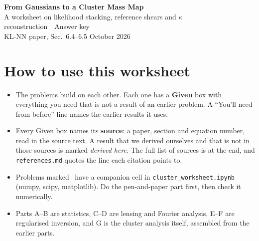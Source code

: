 \begin{center}
{\LARGE\bfseries From Gaussians to a Cluster Mass Map}\\[6pt]
{\large A worksheet on likelihood stacking, reference shears and $\kappa$ reconstruction\ifanswers\ \textemdash\ \textcolor{ForestGreen!60!black}{Answer key}\fi}\\[4pt]
{\normalsize KL-NN paper, Sec.~6.4--6.5 \quad\textbullet\quad October 2026}
\end{center}

\section*{How to use this worksheet}
\begin{itemize}[itemsep=2pt]
  \item The problems build on each other. Each one has a \textbf{Given} box with everything you need that is not a
    result of an earlier problem. A ``You'll need from before'' line names the earlier results it uses.
  \item Every Given box names its \textbf{source}: a paper, section and equation number, read in the source text. A
    result that we derived ourselves and that is not in those sources is marked \emph{derived here}. The full list of
    sources is at the end, and \texttt{references.md} quotes the line each citation points to.
  \item Problems marked \py\ have a companion cell in \texttt{cluster\_worksheet.ipynb} (numpy, scipy, matplotlib). Do
    the pen-and-paper part first, then check it numerically.
  \item Parts A--B are statistics, C--D are lensing and Fourier analysis, E--F are regularised inversion, and G is the
    cluster analysis itself, assembled from the earlier parts.
\end{itemize}

